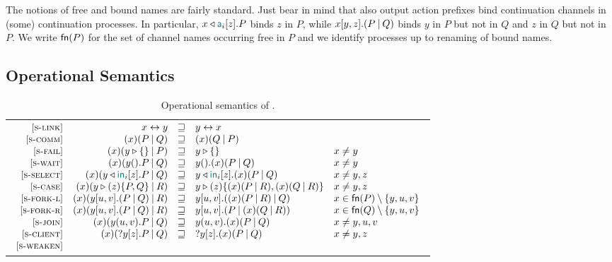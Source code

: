 The notions of free and bound names are fairly standard. Just bear in mind that
also output action prefixes bind continuation channels in (some) continuation
processes. In particular, $\Select\x{\Tag_i}\z.P$ binds $z$ in $P$, while
$\Fork\x\y\z{P}{Q}$ binds $y$ in $P$ but not in $Q$ and $z$ in $Q$ but not in
$P$.
%
We write $\mathsf{fn}(P)$ for the set of channel names occurring free in $P$ and we
identify processes up to renaming of bound names.

\subsection{Operational Semantics}
\label{sec:semantics}

\begin{table}
    \caption{Operational semantics of \Calculus.}
    \label{tab:semantics}
    \begin{tabular}{@{}c@{}}
        \begin{math}
            \displaystyle
            \begin{array}{rrcll}
            \SLink &
            \Link\x\y & \pcong & \Link\y\x \\
            \SComm &
            \Cut\x{P}{Q} & \pcong & \Cut\x{Q}{P} \\
            \SFail &
            \Cut\x{\Fail\y}{P} & \pcong & \Fail\y & x \ne y \\
            \SWait &
            \Cut\x{\Wait\y.P}{Q} & \pcong & \Wait\y.\Cut\x{P}{Q} & x \ne y \\
            \SSelect &
            \Cut\x{\Select\y{\InTag_i}\z.P}{Q} & \pcong & \Select\y{\InTag_i}\z.\Cut\x{P}{Q} & x \ne y,z \\
            \SCase &
            \Cut\x{\Case\y\z{P}{Q}}{R} & \pcong & \Case\y\z{\Cut\x{P}{R}}{\Cut\x{Q}{R}} & x \ne y,z \\
            \SForkL &
            \Cut\x{\Fork\y\u\v{P}{Q}}{R} & \pcong & \Fork\y\u\v{\Cut\x{P}{R}}{Q} & x \in \fn{P}\setminus\set{y,u,v} \\
            \SForkR &
            \Cut\x{\Fork\y\u\v{P}{Q}}{R} & \pcong & \Fork\y\u\v{P}{\Cut\x{Q}{R}} & x \in \fn{Q}\setminus\set{y,u,v} \\
            \SJoin &
            \Cut\x{\Join\y\u\v.P}{Q} & \pcong & \Join\y\u\v.\Cut\x{P}{Q} & x \ne y,u,v \\
            \SClient &
            \Cut\x{\Client\y\z.P}{Q} & \pcong & \Client\y\z.\Cut\x{P}{Q} & x \ne y,z \\
            \SWeaken &

\end{array}
\end{math}
\end{tabular}
\end{table}
